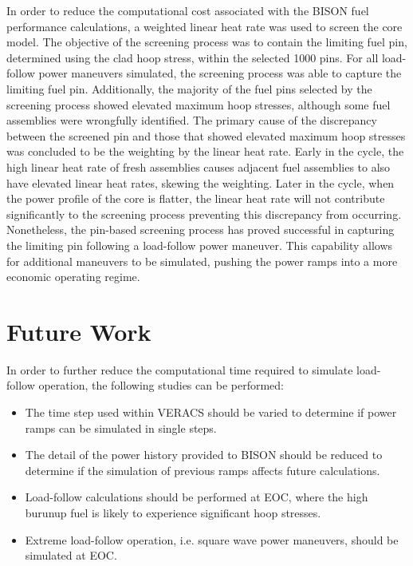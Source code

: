 \documentclass[edeposit,fullpage,11pt]{uiucthesis2009}
\begin{document}
In order to reduce the computational cost associated with the BISON fuel performance calculations, a weighted linear heat rate was used to screen the core model.
The objective of the screening process was to contain the limiting fuel pin, determined using the clad hoop stress, within the selected 1000 pins.
For all load-follow power maneuvers simulated, the screening process was able to capture the limiting fuel pin.
Additionally, the majority of the fuel pins selected by the screening process showed elevated maximum hoop stresses, although some fuel assemblies were wrongfully identified.
The primary cause of the discrepancy between the screened pin and those that showed elevated maximum hoop stresses was concluded to be the weighting by the linear heat rate.
Early in the cycle, the high linear heat rate of fresh assemblies causes adjacent fuel assemblies to also have elevated linear heat rates, skewing the weighting. 
Later in the cycle, when the power profile of the core is flatter, the linear heat rate will not contribute significantly to the screening process preventing this discrepancy from occurring. 
Nonetheless, the pin-based screening process has proved successful in capturing the limiting pin following a load-follow power maneuver. 
This capability allows for additional maneuvers to be simulated, pushing the power ramps into a more economic operating regime.

\section{Future Work}

In order to further reduce the computational time required to simulate load-follow operation, the following studies can be performed:
\begin{itemize}
\item{The time step used within \gls{VERACS} should be varied to determine if power ramps can be simulated in single steps.}
\item{The detail of the power history provided to BISON should be reduced to determine if the simulation of previous ramps affects future calculations.}
\item{Load-follow calculations should be performed at \gls{EOC}, where the high burunup fuel is likely to experience significant hoop stresses.}
\item{Extreme load-follow operation, i.e. square wave power maneuvers, should be simulated at \gls{EOC}.}
\end{itemize} 

\backmatter


\end{document}
